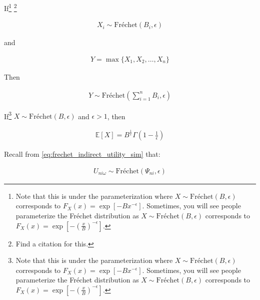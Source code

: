 \documentclass[10pt]{article}
\begin{document}
\begin{notes}
    \label{notes:frechet_max_stability}
    If\footnote{
        Note that this is under the parameterization where 
        $X \sim \text{Fréchet}(B, \epsilon)$ corresponds to $F_X(x)=\exp \left[-B x^{-\epsilon}\right]$.
        Sometimes, you will see people parameterize the Fréchet distribution
        as $X \sim \text{Fréchet}(B, \epsilon)$ corresponds to $F_X(x)=\exp \left[-\left(\frac{x}{B}\right)^{-\epsilon}\right]$.
    } \footnote{\color{red} Find a citation for this.} 

    \begin{align}
        X_i \sim \text{Fréchet}(B_i, \epsilon)
    \end{align}

    and 

    \begin{align}
        Y = \max\{X_1, X_2, \ldots, X_n\}
    \end{align}

    Then 

    \begin{align}
        Y \sim \text{Fréchet}\left(\sum_{i=1}^n B_i, \epsilon\right)
    \end{align}

\end{notes}

\begin{notes}
    \label{notes:frechet_expected_value}
    If\footnote{
        Note that this is under the parameterization where 
        $X \sim \text{Fréchet}(B, \epsilon)$ corresponds to $F_X(x)=\exp \left[-B x^{-\epsilon}\right]$.
        Sometimes, you will see people parameterize the Fréchet distribution
        as $X \sim \text{Fréchet}(B, \epsilon)$ corresponds to $F_X(x)=\exp \left[-\left(\frac{x}{B}\right)^{-\epsilon}\right]$.
    } 
    $X \sim \text{Fréchet}(B, \epsilon)$ and 
    $\epsilon > 1$, then

    \begin{align}
        \mathbb{E}[X] = B^{\frac{1}{\epsilon}} \Gamma\left(1-\frac{1}{\epsilon}\right)
    \end{align}

    
\end{notes}

Recall from \eqref{eq:frechet_indirect_utility_sim} that:

\begin{align}
    U_{n i \omega} \sim \text{Fréchet}\left(\Psi_{n i}, \epsilon\right)
\end{align}
\end{document}
